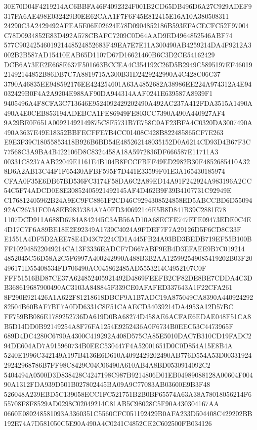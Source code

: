\documentclass[UTF8,fontset=fandol,zihao=-4,a4paper]{ctexart}
\begin{document}
{{30E70D04F4219214AC6BBFA46F4092324F001B2CD65DB496D6A27C929ADEF9317FA6AE498E032429B0EE62CAA1F7F6F45E812415E16A10A380508311
24290C3A2429492AFEA5E06E02624E78D0904852186B593EFACECFC52F97004C78D0934852E83D492A578CBAFC7209C0D64AAD9ED4964852546ABF74
577C9024254601921448524852683F49EA7E7E11A300490AB4259214DA4F9212A3002B2B587AD15410EAB65D1107D67D16621460B6C3D2CE54162429
DCB6A73EE2E668E637F501663BCCEA4C354192C26D5B2949C5895197EF4601921492144852B86DB7C7A8819715A300B31D2429242990A4C428C06C37
3790A46835EE948592176EE424254601A63A4852682A38986EE224A974312A4E94032429B0F4A2A9204E988AF90DA944314AAF0241E639587A8939F1
9405496A4F8CFA3C713646E9524092429202490A492AC237A412FDA3515A1490A490A4E0CEB853194ADEBCA1FE86949FE803CC7390A490A440927AF4
9A29BE0F651A00921492149875C8F5731B7E758C0AF23BFA4C0320DA3007490A490A3637E49E18352BBFECFFE7B4CC01408C428B822485865CF7E263
E9E3F39C18055853418B926B6BD54E485262148035152D0A6214CD93D4B67F3C77568C3A9BA4B422106D8C8324458A18A5972836DF666587E11711A3
00331C8237AAB22049E1161E4B104B8FCCFBEF49ED2982B30F4852685410A328D6A2AB13C44F1F65430AFBF595F7D441E33599F01E3A165430185974
CFAA0F35E6DB67BD536FC3174F58DA6C2A89ED14A91F242924A983196A2CC54C5F74ADCD0E8E30852405921492145AF4D462B9F39B4107731C92949E
C176812405962B24A9EC9FC8861F2CD46C9294308524858ED5ABCCBD6D5509492AC26731FC0A8EB9837384A7A0FD340692146E5B8D841B39C2881E78
1107DCD911A688D6784A842445C3AB56AD10A68ECFE747FFE09473EDE0C4E4D17C7F6A89BE18E2E92349A1730C4024A9FDEF7F7A29126D5F6CD8C33F
E1551A4DF5D2AEE78E4D43C7224CD1A445FB24A93BD3BEDB719EF55B100BFF102948522049214CA13F3336EADCF7D667ABF9EB4D3EFAEE9B7C019214
4852045C56D58A2C5F6997A400242990A488B3B2AA125992549085419202B03F20496171D55408534FD706490AC045862485AD5553214C4952107C0F
FFF51516BD87CE37A624852405921492D4869FEEFB2CF82DE8BE7CDDA4C3DB368619687900490AC3103A848845F339CE0AFAFED337643A1F22CFA261
8F290E921426A1A622F81218618DBCF9A1B7ADC19A875049CA8390A44092429282504B60BAF7BF7A0DD6331C8F51CAAECD34039214DA4953A12D57BC
FF759BB086E1789252736DA619D0BA68274D458AE6ACFAE6EDAE048F51CA8B5D14DD0B92149254A8F76FA1254E9252436A0F6734B0EEC53C4473965F
689D4DC4280C6790A4300C419292A408D575CA85E5010DAC7B310CD19FADC294DE604AD7A915960734B0EEC530447F4A52001651D0C0D854A15E8B4A
5240E1996C342149A197B4136E6D610A4092429202490AB776D554A53D0033192429242968786B7FF98C8429C04C06490A610AB4A8BD0530914092C2
5404494A0500D3D838428C4247198C987B9214806D01EB04989088128A00604F00490A1312FDA939D501B027802445BA09A9C77083AB03600E9B3F48
526048A239EBD5C139058ECC1FC521751B2B0BF65574A63A38A78018056214F655708F8F8529AD0298C02049214C81AB5C98028C5F90A430304167AA
0660E080248581093A3360351C5560CFC051192429B0AFA233D504408C429202BB192E74A7D581050C5E90A490A4C0241C4852CE2C602500FB034126
}}
\end{document}
